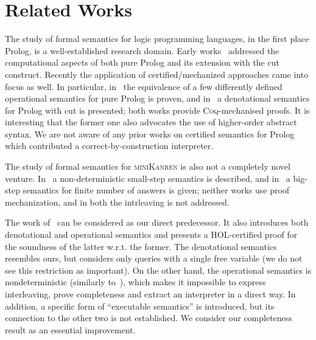 \section{Related Works}

The study of formal semantics for logic programming languages, in the first place Prolog, is a well-established research domain. Early
works~\cite{JonesMycroftSemantics,DebrayMishraSemantics} addressed the computational aspects of both pure Prolog and its extension
with the cut construct. Recently the application of certified/mechanized approaches came into focus as well. In particular,
in~\cite{CertifiedPrologEquivalences} the equivalence of a few differently defined operational semantics
for pure Prolog is proven, and in~\cite{CeritfiedDenotationalCut} a denotational semantics for Prolog with cut is presented; both
works provide \textsc{Coq}-mechanised proofs. It is interesting that the former one also advocates the use of higher-order
abstract syntax. We are not aware of any prior works on certified semantics for Prolog which contributed a correct-by-construction
interpreter.

The study of formal semantics for \textsc{miniKanren} is also not a completely novel venture. In~\cite{RelConversion} a non-deterministic
small-step semantics is described, and in~\cite{DivTest} a big-step semantics for finite number of answers is given;
neither works use proof mechanization, and in both the intrleaving is not addressed. 

The work of~\citet{MechanisingMiniKanren} can be considered as our direct predecessor. It also introduces both denotational and
operational semantics and presents a HOL-certified proof for the soundness of the latter w.r.t. the former. The denotational
semantics resembles ours, but considers only queries with a single free variable (we do not see this restriction as important).
On the other hand, the operational semantics is nondeterministic (similarly to~\cite{RelConversion}), which makes it
impossible to express interleaving, prove completeness and extract an interpreter in a direct way.  In addition, a
specific form of ``executable semantics'' is introduced, but its connection to the other two is not established.
We consider our completeness result as an essential improvement. 




